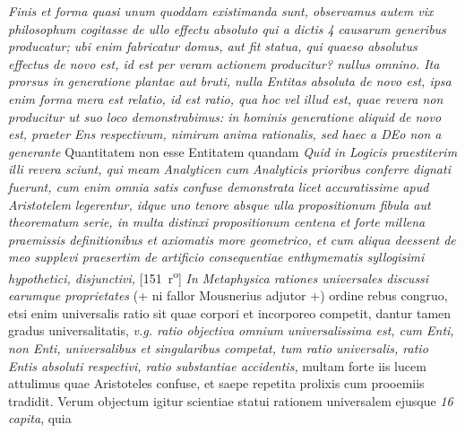 \pend 
\pstart {}  \textit{Finis et forma quasi unum quoddam existimanda sunt, observamus autem vix}
\textit{philosophum cogitasse de ullo effectu absoluto qui a dictis 4 causarum generibus producatur; ubi enim fabricatur domus, aut fit statua, qui quaeso absolutus effectus de novo est, id est per veram actionem producitur? nullus omnino. Ita prorsus in generatione plantae aut bruti, nulla Entitas absoluta de novo est, ipsa enim forma mera est relatio, id est ratio, qua hoc vel illud est, quae revera non producitur ut suo loco demonstrabimus: in hominis generatione aliquid de novo est, praeter Ens respectivum\protect{}, nimirum anima rationalis\protect{}, sed haec a DEo non a generante} 
\pend 
\pstart {} Quantitatem non esse Entitatem quandam 
\pend
\pstart {}
\textit{Quid in Logicis praestiterim illi revera sciunt, qui meam Analyticen cum Analyticis prioribus conferre dignati fuerunt, cum enim omnia satis confuse demonstrata licet accuratissime apud}
\textit{Aristotelem}\protect{}
\textit{legerentur, idque uno tenore absque ulla propositionum fibula aut theorematum serie, in multa distinxi propositionum centena et forte millena praemissis definitionibus et axiomatis more geometrico\protect{}, et cum aliqua deessent de meo supplevi praesertim de artificio consequentiae enthymematis syllogisimi hypothetici, disjunctivi, }
[151~r\textsuperscript{o}]
\pend%
\count{}
\count{}
\count{}
\pstart%
%
%
%
% 
 \textit{In Metaphysica\protect{} rationes universales\protect{} discussi earumque proprietates 
} (+ ni fallor Mousnerius\protect{} adjutor +) ordine rebus congruo, etsi enim universalis ratio sit quae corpori et incorporeo competit, dantur tamen gradus universalitatis, \textit{v.g. ratio objectiva omnium universalissima est, cum Enti, non Enti, universalibus et singularibus competat, tum ratio universalis, ratio Entis absoluti respectivi, ratio substantiae accidentis,} multam forte iis lucem attulimus quae Aristoteles\protect{} confuse, et saepe repetita prolixis cum prooemiis tradidit. Verum objectum igitur scientiae statui rationem universalem ejusque \textit{16 capita}, quia
